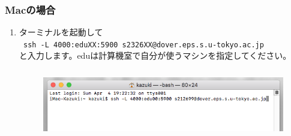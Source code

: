 \documentclass{jarticle}
\begin{document}
\subsubsection{Macの場合}
\begin{enumerate}
  \item ターミナルを起動して\\
    \verb| ssh -L 4000:eduXX:5900 s2326XX@dover.eps.s.u-tokyo.ac.jp |  \\
  と入力します。eduは計算機室で自分が使うマシンを指定してください。
  \begin{figure}[H]
    \centering
    \includegraphics[height=3cm,pagebox=cropbox,clip]{fig/VNCMac1.png}
  \end{figure}


\end{enumerate}
\end{document}

